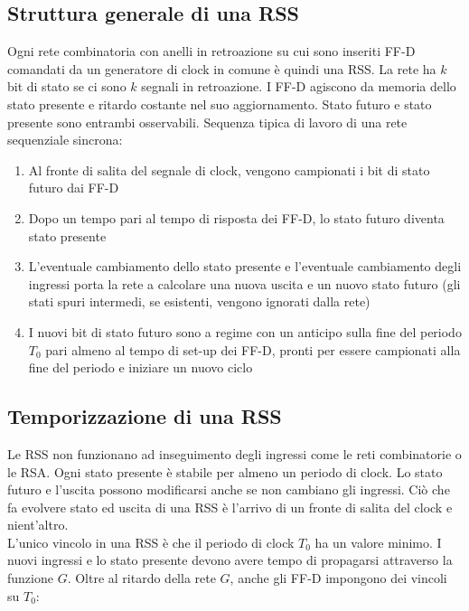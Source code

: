 \documentclass{article}
\begin{document}
\subsection{Struttura generale di una RSS}

Ogni rete combinatoria con anelli in retroazione su cui sono inseriti FF-D comandati da un generatore di clock in comune è quindi una RSS.
La rete ha $k$ bit di stato se ci sono $k$ segnali in retroazione.
I FF-D agiscono da memoria dello stato presente e ritardo costante nel suo aggiornamento.
Stato futuro e stato presente sono entrambi osservabili.
Sequenza tipica di lavoro di una rete sequenziale sincrona:

\begin{enumerate}
    \item Al fronte di salita del segnale di clock, vengono campionati i bit di stato futuro dai FF-D
    \item Dopo un tempo pari al tempo di risposta dei FF-D, lo stato futuro diventa stato presente
    \item L'eventuale cambiamento dello stato presente e l'eventuale cambiamento degli ingressi porta la rete a calcolare una nuova uscita e un nuovo stato futuro (gli stati spuri intermedi, se esistenti, vengono ignorati dalla rete)
    \item I nuovi bit di stato futuro sono a regime con un anticipo sulla fine del periodo $T_0$ pari almeno al tempo di set-up dei FF-D, pronti per essere campionati alla fine del periodo e iniziare un nuovo ciclo
\end{enumerate}

\subsection{Temporizzazione di una RSS}

Le RSS non funzionano ad inseguimento degli ingressi come le reti combinatorie o le RSA.
Ogni stato presente è stabile per almeno un periodo di clock.
Lo stato futuro e l'uscita possono modificarsi anche se non cambiano gli ingressi.
Ciò che fa evolvere stato ed uscita di una RSS è l'arrivo di un fronte di salita del clock e nient'altro.\\

\noindent
L'unico vincolo in una RSS è che il periodo di clock $T_0$ ha un valore minimo.
I nuovi ingressi e lo stato presente devono avere tempo di propagarsi attraverso la funzione $G$.
Oltre al ritardo della rete $G$, anche gli FF-D impongono dei vincoli su $T_0$:
\end{document}
